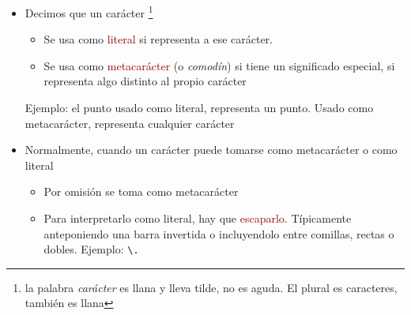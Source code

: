 \documentclass[ucs]{beamer}
\newcommand{\res}[1]{\textcolor{darkred}{#1}}
\begin{document}
\begin{frame}[fragile]
\frametitle{}
\begin{itemize}
\item
Decimos que un carácter
\footnote{la palabra \emph{carácter} es llana y lleva tilde, no es aguda.
El plural es caracteres, también es llana}
\begin{itemize}
\item
Se usa como \res{literal} si representa a ese carácter. 
\item
Se usa como \res{metacarácter} (o \emph{comodín}) si tiene un 
significado especial, si 
representa algo distinto al propio carácter
\end{itemize}

Ejemplo: el punto usado como literal, representa un punto. Usado como
metacarácter, representa cualquier carácter

\item
Normalmente, cuando un carácter puede tomarse como metacarácter
o como literal
\begin{itemize}
\item
Por omisión se toma como metacarácter

\item
Para interpretarlo como literal, hay que \res{escaparlo}. Típicamente
anteponiendo una barra invertida o incluyendolo entre comillas, rectas
o dobles. Ejemplo: \verb|\.|
\end{itemize}
\end{itemize}

\end{frame}

\end{document}

